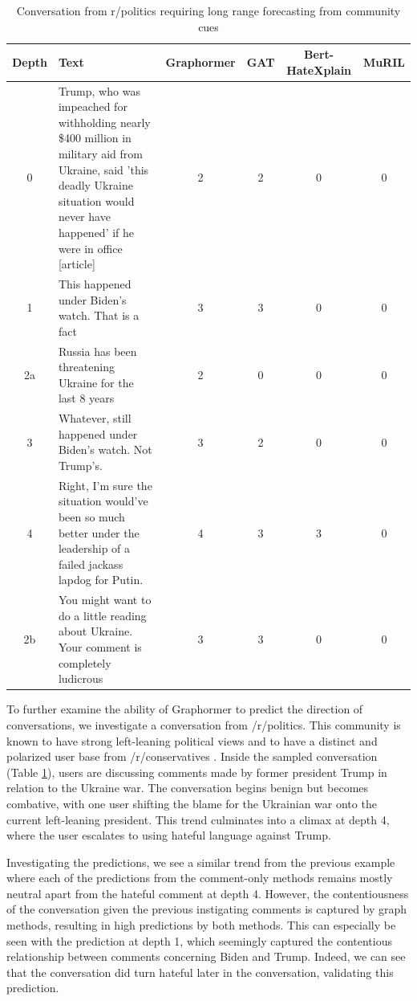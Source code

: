 \documentclass[letterpaper]{article} %
\begin{document}
\begin{table}
    \centering
        \caption{Conversation from r/politics requiring long range forecasting from community cues}
    \begin{tabular}{c|p{8cm}|c|c|c|c}
        Depth & Text & Graphormer & GAT & Bert-HateXplain & MuRIL \\
        \hline
        \hline
        0 & Trump, who was impeached for withholding nearly \$400 million in military aid from Ukraine, said 'this deadly Ukraine situation would never have happened' if he were in office [article] & 2 & 2 & 0 & 0 \\
        \hline
        1 & This happened under Biden's watch. That is a fact & 3 & 3 & 0 & 0  \\
        \hline 
        2a & Russia has been threatening Ukraine for the last 8 years & 2 & 0 & 0 & 0 \\
        \hline
        3 & Whatever, still happened under Biden's watch. Not Trump's. & 3 & 2 & 0 & 0\\
        \hline
        4 & Right, I'm sure the situation would've been so much better under the leadership of a failed jackass lapdog for Putin. & 4 & 3 & 3 & 0\\
        \hline
        2b & You might want to do a little reading about Ukraine. Your comment is completely ludicrous & 3 & 3 & 0 & 0
    \end{tabular}
    \label{tab:predictive-trump}
\end{table}
To further examine the ability of Graphormer to predict the direction of conversations, we investigate a conversation from /r/politics. This community is known to have strong left-leaning political views and to have a distinct and polarized user base from /r/conservatives \cite{Waller2021}. Inside the sampled conversation (Table \ref{tab:predictive-trump}), users are discussing comments made by former president Trump in relation to the Ukraine war. The conversation begins benign but becomes combative,  %
with one user shifting the blame for the Ukrainian war onto the current left-leaning president. This trend culminates into a climax at depth 4, where the user escalates to using hateful language against Trump. 

Investigating the predictions, we see a similar trend from the previous example where each of the predictions from the comment-only methods remains mostly neutral apart from the hateful comment at depth 4. However, the contentiousness of the conversation given the previous instigating comments is captured by graph methods, resulting in high predictions by both methods. This can especially be seen with the prediction at depth 1, which seemingly captured the contentious relationship between comments concerning Biden and Trump. Indeed, we can see that the conversation did turn hateful later in the conversation, validating this prediction.   
\end{document}
